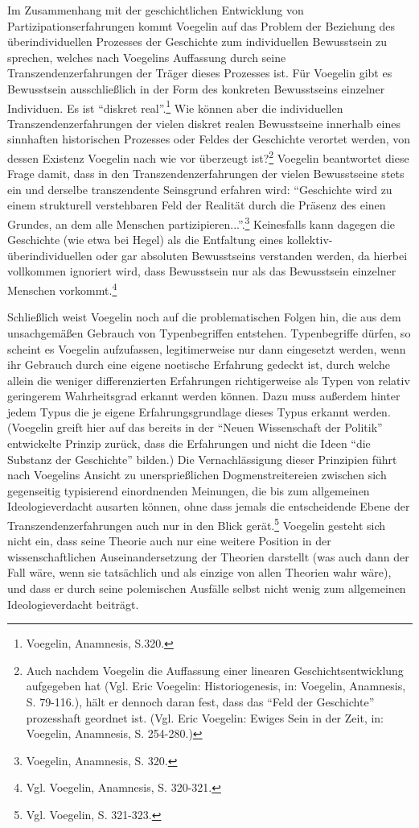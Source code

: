 Im \label{HistorischerKollektivismus}Zusammenhang mit der geschichtlichen
Entwicklung von Partizipationserfahrungen kommt Voegelin auf das Problem der
Beziehung des überindividuellen Prozesses der Geschichte zum individuellen
Bewusstsein zu sprechen, welches nach Voegelins Auffassung durch seine
Transzendenzerfahrungen der Träger dieses Prozesses ist. Für Voegelin gibt es
Bewusstsein ausschließlich in der Form des konkreten Bewusstseins einzelner
Individuen. Es ist "`diskret real"'.\footnote{Voegelin, Anamnesis, S.320.}
Wie können aber die individuellen Transzendenzerfahrungen der vielen diskret
realen Bewusstseine innerhalb eines sinnhaften historischen Prozesses oder
Feldes der Geschichte verortet werden, von dessen Existenz Voegelin nach wie
vor überzeugt ist?\footnote{Auch nachdem Voegelin die Auffassung einer
  linearen Geschichtsentwicklung aufgegeben hat (Vgl. Eric Voegelin:
  Historiogenesis, in: Voegelin, Anamnesis, S. 79-116.), hält er dennoch daran
  fest, dass das "`Feld der Geschichte"' prozesshaft geordnet ist.  (Vgl. Eric
  Voegelin: Ewiges Sein in der Zeit, in: Voegelin, Anamnesis, S. 254-280.)}
Voegelin beantwortet diese Frage damit, dass in den Transzendenzerfahrungen der
vielen Bewusstseine stets ein und derselbe transzendente Seinsgrund erfahren
wird: "`Geschichte wird zu einem strukturell verstehbaren Feld der Realität
durch die Präsenz des einen Grundes, an dem alle Menschen
partizipieren..."'.\footnote{Voegelin, Anamnesis, S. 320.} Keinesfalls kann
dagegen die Geschichte (wie etwa bei Hegel) als die Entfaltung eines
kollektiv-überindividuellen oder gar absoluten Bewusstseins verstanden werden,
da hierbei vollkommen ignoriert wird, dass Bewusstsein nur als das Bewusstsein
einzelner Menschen vorkommt.\footnote{Vgl.  Voegelin, Anamnesis, S. 320-321.}

Schließlich weist Voegelin noch auf die problematischen Folgen hin, die
aus dem unsachgemäßen Gebrauch von Typenbegriffen entstehen.
Typenbegriffe dürfen, so scheint es Voegelin aufzufassen, legitimerweise
nur dann eingesetzt werden, wenn ihr Gebrauch durch eine eigene
noetische Erfahrung gedeckt ist, durch welche allein die weniger
differenzierten Erfahrungen richtigerweise als Typen von relativ
geringerem Wahrheitsgrad erkannt werden können. Dazu muss außerdem hinter
jedem Typus die je eigene Erfahrungsgrundlage dieses Typus erkannt
werden. (Voegelin greift hier auf das bereits in der "`Neuen
Wissenschaft der Politik"' entwickelte Prinzip zurück, dass die
Erfahrungen und nicht die Ideen "`die Substanz der Geschichte"' bilden.)
Die Vernachlässigung dieser Prinzipien führt nach Voegelins Ansicht zu
unersprießlichen Dogmenstreitereien zwischen sich gegenseitig
typisierend einordnenden Meinungen, die bis zum allgemeinen
Ideologieverdacht ausarten können, ohne dass jemals die entscheidende
Ebene der Transzendenzerfahrungen auch nur in den Blick
gerät.\footnote{Vgl. Voegelin, S. 321-323.} Voegelin gesteht sich nicht
ein, dass seine Theorie auch nur eine weitere Position in der
wissenschaftlichen Auseinandersetzung der Theorien darstellt (was auch
dann der Fall wäre, wenn sie tatsächlich und als einzige von allen
Theorien wahr wäre), und dass er durch seine polemischen Ausfälle selbst
nicht wenig zum allgemeinen Ideologieverdacht beiträgt.

